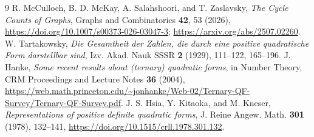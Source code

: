 \documentclass[9pt,a4paper,twocolumn]{extarticle}
\begin{document}
\begin{thebibliography}{9}
R. McCulloch, B. D. McKay, A. Salahshoori, and T. Zaslavsky,
\emph{The Cycle Counts of Graphs}, Graphs and Combinatorics \textbf{42}, 53 (2026), \url{https://doi.org/10.1007/s00373-026-03047-3}; \url{https://arxiv.org/abs/2507.02260}.
W. Tartakowsky, \emph{Die Gesamtheit der Zahlen, die durch eine positive quadratische Form darstellbar sind}, Izv. Akad. Nauk SSSR \textbf{2} (1929), 111--122, 165--196.
J. Hanke, \emph{Some recent results about (ternary) quadratic forms}, in Number Theory, CRM Proceedings and Lecture Notes \textbf{36} (2004), \url{https://web.math.princeton.edu/~jonhanke/Web-02/Ternary-QF-Survey/Ternary-QF-Survey.pdf}.
J. S. Hsia, Y. Kitaoka, and M. Kneser, \emph{Representations of positive definite quadratic forms}, J. Reine Angew. Math. \textbf{301} (1978), 132--141, \url{https://doi.org/10.1515/crll.1978.301.132}.
\end{thebibliography}
\end{document}
